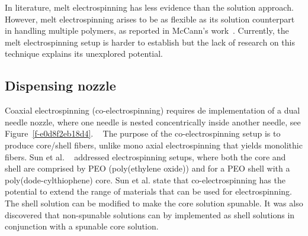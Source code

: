 \documentclass[5p,,preprint,12pt,twocolumn]{elsarticle}
\begin{document}
In literature, melt electrospinning has less evidence than the solution approach. However, melt electrospinning arises to be as flexible as its solution counterpart in handling multiple polymers, as reported in McCann's work\unskip~\cite{527120:13534572}. Currently, the melt electrospinning setup is harder to establish but the lack of research on this technique explains its unexplored potential.



\subsection{Dispensing nozzle}Coaxial electrospinning (co-electrospinning) requires de implementation of a dual needle nozzle, where one needle is nested concentrically inside another needle, see Figure~\ref{f-e0d8f2eb18d4}. \unskip~\cite{527120:13914792,527120:13914793} The purpose of the co-electrospinning setup is to produce core/shell fibers, unlike mono axial electrospinning that yields monolithic fibers. Sun et al. \unskip~\cite{527120:13914312} addressed electrospinning setups, where both the core and shell are comprised by PEO (poly(ethylene oxide)) and for a PEO shell with a poly(dode-cylthiophene) core. Sun et al. state that co-electrospinning has the potential to extend the range of materials that can be used for electrospinning. The shell solution can be modified to make the core solution spunable. It was also discovered that non-spunable solutions can by implemented as shell solutions in conjunction with a spunable core solution. \unskip~\cite{527120:13914968}
\end{document}
